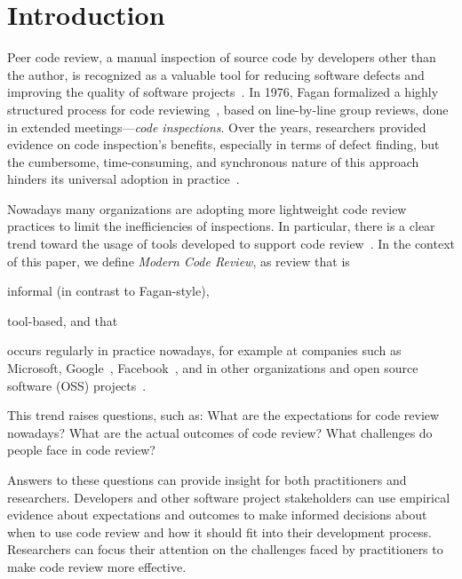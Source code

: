 
\section{Introduction} \label{sec:introduction}


Peer code review, a manual inspection of source code by developers other than
the author, is recognized as a valuable tool for reducing software defects and
improving the quality of software projects~\cite{ackerman1984software, ackerman1989software}.
In 1976, Fagan formalized a highly
structured process for code reviewing~\cite{fagan1976design}, based on line-by-line group
reviews, done in extended meetings---\emph{code inspections}. Over the years,
researchers provided evidence on code inspection's benefits, especially in
terms of defect finding, but the cumbersome, time-consuming, and synchronous
nature of this approach hinders its universal adoption in practice~\cite{shull2008inspecting}. %

Nowadays many organizations are adopting more lightweight code review
practices to limit the inefficiencies of inspections. In particular, there is a
clear trend toward the usage of tools developed to support code
review~\cite{rigby2012open}. In the context of this paper, we define
\emph{Modern Code Review}, as review that is \begin{inparaenum}[(1)]
\item informal (in contrast to Fagan-style), 
\item tool-based, and that 
\item occurs regularly in practice nowadays, for example at companies such as Microsoft, Google~\cite{kennedy2006online},
Facebook~\cite{tsotsis2011online}, and in other organizations and open source software (OSS) projects~\cite{gerrit2012online}. \end{inparaenum}

This trend raises questions, such as: What are the
expectations for code review nowadays? What are the actual outcomes of code
review? What challenges do people face in code review?

Answers to these questions can provide insight for both practitioners and
researchers.  Developers and other software project stakeholders can use
empirical evidence about expectations and outcomes to make informed decisions
about when to use code review and how it should fit into their development
process. Researchers can focus their attention on the challenges faced by practitioners to make code review more effective.


